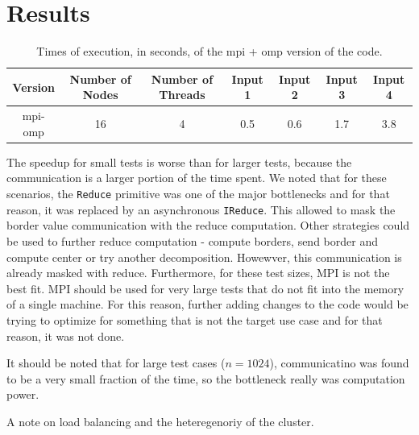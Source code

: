 \documentclass{article}
\begin{document}
\section{Results}


\begin{table}[h!]
	\centering
	\begin{tabular}{||c c c c c c c||} 
	 \hline
	 Version & Number of Nodes & Number of Threads & Input 1 & Input 2 & Input 3 & Input 4\\ [0.5ex] 
	 \hline\hline
	 mpi-omp & 16 & 4 & 0.5 & 0.6 & 1.7 & 3.8 \\  [1ex] 
	 \hline
	\end{tabular}
	\caption{Times of execution, in seconds, of the mpi + omp version of the code.}
	\label{times-mpi-omp}
\end{table}

The speedup for small tests is worse than for larger tests, because the communication
is a larger portion of the time spent. We noted that for these scenarios, the
\texttt{Reduce} primitive was one of the major bottlenecks and for that reason,
it was replaced by an asynchronous \texttt{IReduce}. This allowed to mask the
border value communication with the reduce computation. Other strategies could be used
to further reduce computation - compute borders, send border and compute center or 
try another decomposition. Howewver, this communication is already masked with
reduce. Furthermore, for these test sizes, MPI is not the best fit. MPI should
be used for very large tests that do not fit into the memory of a single machine.
For this reason, further adding changes to the code would be trying to optimize
for something that is not the target use case and for that reason, it was not done.

It should be noted that for large test cases ($n=1024$), communicatino was found
to be a very small fraction of the time, so the bottleneck really was computation power.

A note on load balancing and the heteregenoriy of the cluster.

\newpage
\end{document}
